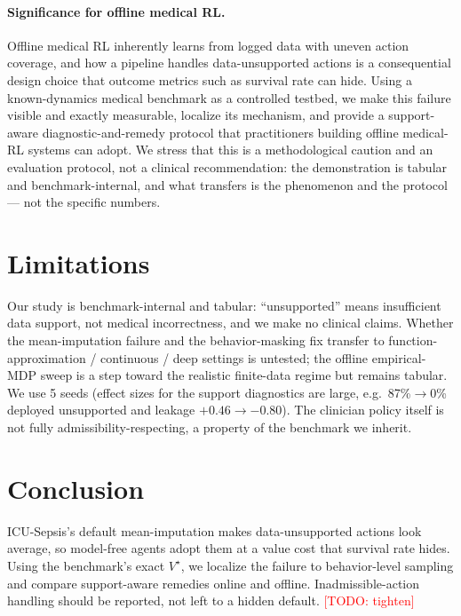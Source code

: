\documentclass{article}
\newcommand{\todo}[1]{\textcolor{red}{[TODO: #1]}}
\begin{document}
\paragraph{Significance for offline medical RL.}
Offline medical RL inherently learns from logged data with uneven action coverage,
and how a pipeline handles data-unsupported actions is a consequential design choice
that outcome metrics such as survival rate can hide. Using a known-dynamics medical
benchmark as a controlled testbed, we make this failure visible and exactly
measurable, localize its mechanism, and provide a support-aware
diagnostic-and-remedy protocol that practitioners building offline medical-RL
systems can adopt. We stress that this is a methodological caution and an evaluation
protocol, not a clinical recommendation: the demonstration is tabular and
benchmark-internal, and what transfers is the phenomenon and the protocol --- not the
specific numbers.

\section{Limitations}
Our study is benchmark-internal and tabular: ``unsupported'' means insufficient data
support, not medical incorrectness, and we make no clinical claims. Whether the
mean-imputation failure and the behavior-masking fix transfer to function-approximation
/ continuous / deep settings is untested; the offline empirical-MDP sweep is a step
toward the realistic finite-data regime but remains tabular. We use 5 seeds (effect
sizes for the support diagnostics are large, e.g.\ 87\%$\to$0\% deployed unsupported
and leakage $+0.46\to-0.80$). The clinician policy itself is not fully
admissibility-respecting, a property of the benchmark we inherit.

\section{Conclusion}
ICU-Sepsis's default mean-imputation makes data-unsupported actions look average, so
model-free agents adopt them at a value cost that survival rate hides. Using the
benchmark's exact $V^\star$, we localize the failure to behavior-level sampling and
compare support-aware remedies online and offline. Inadmissible-action handling
should be reported, not left to a hidden default. \todo{tighten}



\end{document}
